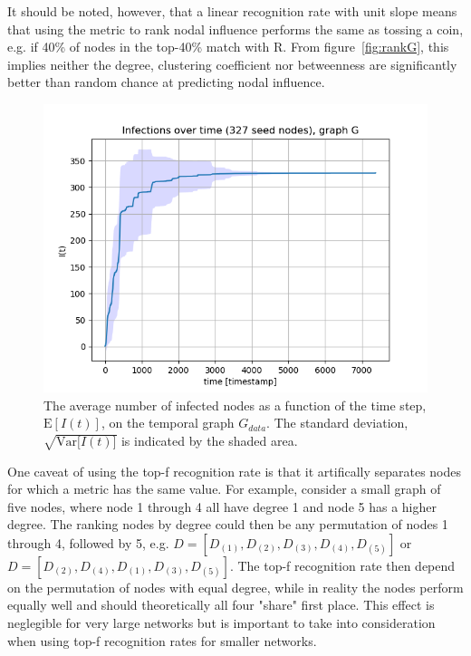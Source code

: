 \documentclass[letterpaper]{article}
\begin{document}
It should be noted, however, that a linear recognition rate with unit slope means that using the metric to rank nodal influence performs the same as tossing a coin, e.g. if 40\% of nodes in the top-40\% match with R. From figure~\ref{fig:rankG}, this implies neither the degree, clustering coefficient nor betweenness are significantly better than random chance at predicting nodal influence.

\begin{figure}[ht!]
  \centering
   \includegraphics[width=\textwidth]{img/infections_G.png}
   \caption{The average number of infected nodes as a function of the time step, $\mathrm{E}[I(t)]$, 
 on the temporal graph $G_{data}$. The standard deviation, $\sqrt{\mathrm{Var}{[I(t)}]}$ is indicated by the shaded area.}
   \label{fig:infections_G}
\end{figure}

One caveat of using the top-f recognition rate is that it artifically separates nodes for which a metric has the same value. For example, consider a small graph of five nodes, where node 1 through 4 all have degree 1 and node 5 has a higher degree. The ranking nodes by degree could then be any permutation of nodes 1 through 4, followed by 5, e.g. \(D=[D_{(1)},D_{(2)},D_{(3)},D_{(4)},D_{(5)}]\) or \(D=[D_{(2)},D_{(4)},D_{(1)},D_{(3)},D_{(5)}]\). The top-f recognition rate then depend on the permutation of nodes with equal degree, while in reality the nodes perform equally well and should theoretically all four "share" first place. This effect is neglegible for very large networks but is important to take into consideration when using top-f recognition rates for smaller networks.
\end{document}
